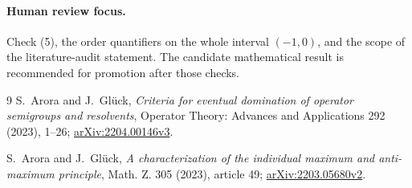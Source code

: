 \documentclass[11pt]{article}
\begin{document}
\paragraph{Human review focus.}
Check (5), the order quantifiers on the whole interval $(-1,0)$, and the scope
of the literature-audit statement.  The candidate mathematical result is
recommended for promotion after those checks.

\begin{thebibliography}{9}
S.~Arora and J.~Gl\"uck,
\emph{Criteria for eventual domination of operator semigroups and resolvents},
Operator Theory: Advances and Applications 292 (2023), 1--26;
\href{https://arxiv.org/abs/2204.00146}{arXiv:2204.00146v3}.

S.~Arora and J.~Gl\"uck,
\emph{A characterization of the individual maximum and anti-maximum principle},
Math. Z. 305 (2023), article 49;
\href{https://arxiv.org/abs/2203.05680}{arXiv:2203.05680v2}.
\end{thebibliography}
\end{document}
